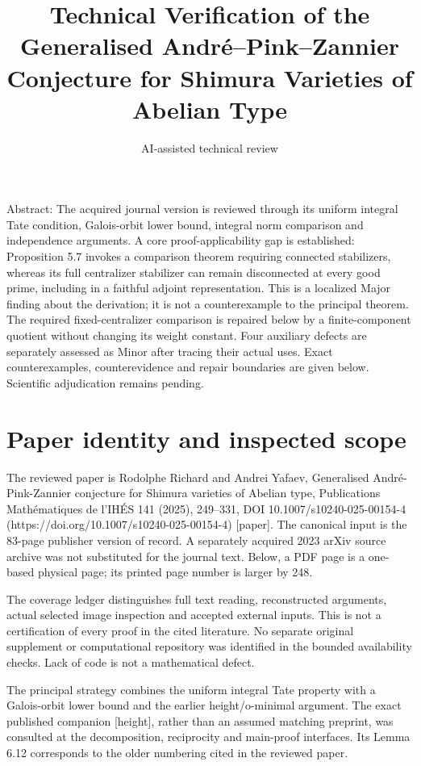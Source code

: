 \documentclass[10pt]{article}
\title{Technical Verification of the Generalised
André–Pink–Zannier Conjecture
for Shimura Varieties of Abelian Type}
\author{AI-assisted technical review}
\date{}
\begin{document}
\maketitle
Abstract: The acquired journal version is reviewed through its uniform integral Tate condition, Galois-orbit lower bound, integral norm comparison and independence arguments. A core proof-applicability gap is established: Proposition 5.7 invokes a comparison theorem requiring connected stabilizers, whereas its full centralizer stabilizer can remain disconnected at every good prime, including in a faithful adjoint representation. This is a localized Major finding about the derivation; it is not a counterexample to the principal theorem. The required fixed-centralizer comparison is repaired below by a finite-component quotient without changing its weight constant. Four auxiliary defects are separately assessed as Minor after tracing their actual uses. Exact counterexamples, counterevidence and repair boundaries are given below. Scientific adjudication remains pending.\par
\section*{Paper identity and inspected scope}
The reviewed paper is Rodolphe Richard and Andrei Yafaev, Generalised André-Pink-Zannier conjecture for Shimura varieties of Abelian type, Publications Mathématiques de l’IHÉS 141 (2025), 249–331, DOI 10.1007/s10240-025-00154-4 (https://doi.org/10.1007/s10240-025-00154-4) [paper]. The canonical input is the 83-page publisher version of record. A separately acquired 2023 arXiv source archive was not substituted for the journal text. Below, a PDF page is a one-based physical page; its printed page number is larger by 248.\par
The coverage ledger distinguishes full text reading, reconstructed arguments, actual selected image inspection and accepted external inputs. This is not a certification of every proof in the cited literature. No separate original supplement or computational repository was identified in the bounded availability checks. Lack of code is not a mathematical defect.\par
The principal strategy combines the uniform integral Tate property with a Galois-orbit lower bound and the earlier height/o-minimal argument. The exact published companion [height], rather than an assumed matching preprint, was consulted at the decomposition, reciprocity and main-proof interfaces. Its Lemma 6.12 corresponds to the older numbering cited in the reviewed paper.\par
\end{document}
